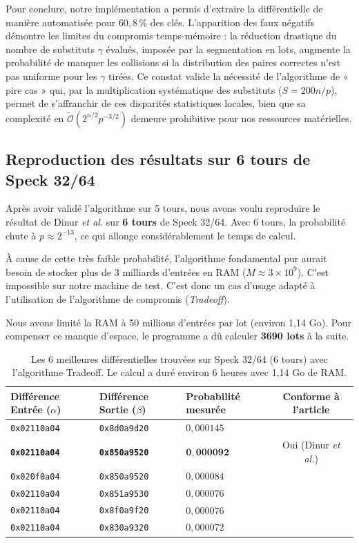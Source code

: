 \documentclass[a4paper,11pt]{article}
\begin{document}
Pour conclure, notre implémentation a permis d'extraire la différentielle de manière automatisée pour $60,8\,\%$ des clés. L'apparition des faux négatifs démontre les limites du compromis temps-mémoire : la réduction drastique du nombre de substituts $\gamma$ évalués, imposée par la segmentation en lots, augmente la probabilité de manquer les collisions si la distribution des paires correctes n'est pas uniforme pour les $\gamma$ tirées. Ce constat valide la nécessité de l'algorithme de « pire cas » qui, par la multiplication systématique des substituts ($S = 200n/p$), permet de s'affranchir de ces disparités statistiques locales, bien que sa complexité en $\tilde{\mathcal{O}}(2^{n/2} p^{-3/2})$ demeure prohibitive pour nos ressources matérielles.

\subsection{Reproduction des résultats sur 6 tours de Speck 32/64}

Après avoir validé l'algorithme sur 5 tours, nous avons voulu reproduire le résultat de Dinur \textit{et al.} sur \textbf{6 tours} de Speck 32/64. Avec 6 tours, la probabilité chute à $p \approx 2^{-13}$, ce qui allonge considérablement le temps de calcul.

À cause de cette très faible probabilité, l'algorithme fondamental pur aurait besoin de stocker plus de 3 milliards d'entrées en RAM ($M \approx 3 \times 10^9$). C'est impossible sur notre machine de test. C'est donc un cas d'usage adapté à l'utilisation de l'algorithme de compromis (\textit{Tradeoff}).

Nous avons limité la RAM à 50 millions d'entrées par lot (environ 1,14 Go). Pour compenser ce manque d'espace, le programme a dû calculer \textbf{3690 lots} à la suite.

\begin{table}[htbp]
    \centering
    \caption{Les 6 meilleures différentielles trouvées sur Speck 32/64 (6 tours) avec l'algorithme Tradeoff. Le calcul a duré environ 6 heures avec 1,14 Go de RAM.}
    \label{tab:speck_6tours}
    \begin{tabular}{lllc}
        \toprule
        \textbf{Différence Entrée ($\alpha$)} & \textbf{Différence Sortie ($\beta$)} & \textbf{Probabilité mesurée} & \textbf{Conforme à l'article} \\
        \midrule
        \texttt{0x02110a04} & \texttt{0x8d0a9d20} & $0,000145$ & \\
        \textbf{\texttt{0x02110a04}} & \textbf{\texttt{0x850a9520}} & $\mathbf{0,000092}$ & Oui (Dinur \textit{et al.}) \\
        \texttt{0x020f0a04} & \texttt{0x850a9520} & $0,000084$ & \\
        \texttt{0x02110a04} & \texttt{0x851a9530} & $0,000076$ & \\
        \texttt{0x02110a04} & \texttt{0x8f0a9f20} & $0,000076$ & \\
        \texttt{0x02110a04} & \texttt{0x830a9320} & $0,000072$ & \\
        \bottomrule
    \end{tabular}
\end{table}
\end{document}
